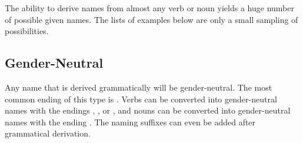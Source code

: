 The ability to derive names from almost any verb or noun yields a huge number of possible given names. The lists of examples below are only a small sampling of possibilities.

\subsection*{Gender-Neutral}

Any name that is derived grammatically will be gender-neutral. The most common ending of this type is . Verbs can be converted into gender-neutral names with the endings , , or , and nouns can be converted into gender-neutral names with the ending . The naming suffixes can even be added after grammatical derivation.

\begin{multicols}{2}\noindent
	 \\
	 \\
	 \\
	 \\
	 \\
	 \\
	 \\
	 \\
	 \\
	 \\
	 \\
	 \\
	 \\
	 \\
	 \\
	 \\
	 \\
	 \\
	 \\
	 \\
	 \\
	 \\
	 \\
	 \\

\end{multicols}
